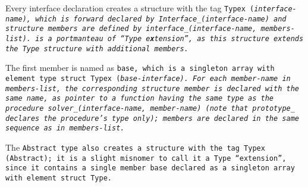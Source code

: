 \def\Subsubsection#1{\subsubsection{\idx{#1}}
}

Every interface declaration creates a structure with the tag
\tt{Typex (}\it{interface-name}\tt{)}, which is forward declared by
\tt{Interface_(}\it{interface-name}\tt{)} and structure members are defined by
\tt{interface_(}\it{interface-name}\tt{,} \it{members-list}\tt{)}.
 is a portmanteau of ``\tt{Type} e{\bf x}tension'',
as this structure extends the \tt{Type} structure with additional members.

The first member is named as \tt{base}, which is a singleton array
with element type \tt{struct Typex (}\it{base-interface}\tt{)}.
For each \it{member-name} in \it{members-list}, the corresponding structure
member is declared with the same name, as pointer to a function having the same
type as the procedure \tt{solver_(}\it{interface-name}\tt{,} \it{member-name}\tt{)}
(note that \tt{prototype_} declares the procedure's type only);
members are declared in the same sequence as in \it{members-list}.

The \tt{Abstract} type also creates a structure with the tag \tt{Typex (Abstract)};
it is a slight misnomer to call it a \tt{Type} ``extension'', since it contains a
single member \tt{base} declared as a singleton array with element \tt{struct Type}.

\Subsubsection{is_typex}
